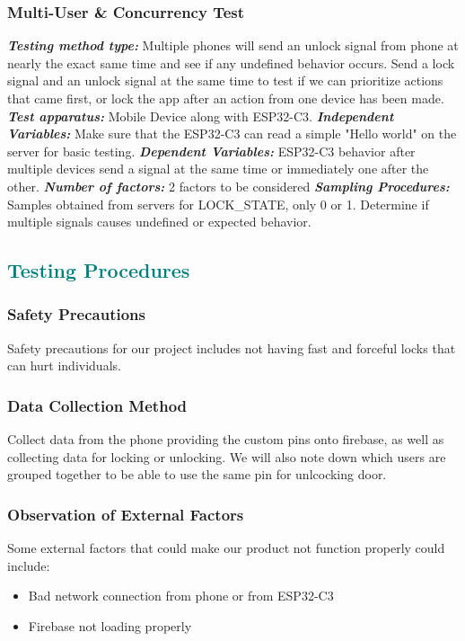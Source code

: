 \subsubsection{Multi-User \& Concurrency Test}
\textbf{\textit{Testing method type:}} Multiple phones will send an unlock signal from phone at nearly the exact same time and see if any undefined behavior occurs. Send a lock signal and an unlock signal at the same time to test if we can prioritize actions that came first, or lock the app after an action from one device has been made.
\newline
\textbf{\textit{Test apparatus:}} Mobile Device along with ESP32-C3.
\newline
\textbf{\textit{Independent Variables:}} Make sure that the ESP32-C3 can read a simple "Hello world" on the server for basic testing.
\newline
\textbf{\textit{Dependent Variables:}} ESP32-C3 behavior after multiple devices send a signal at the same time or immediately one after the other.
\newline
\textbf{\textit{Number of factors:}} 2 factors to be considered
\newline
\textbf{\textit{Sampling Procedures:}} Samples obtained from servers for LOCK\_STATE, only 0 or 1. Determine if multiple signals causes undefined or expected behavior.



\textcolor{teal}{\subsection*{Testing Procedures}}
\subsubsection{Safety Precautions}
Safety precautions for our project includes not having fast and forceful locks that can hurt individuals.

\subsubsection{Data Collection Method}
Collect data from the phone providing the custom pins onto firebase, as well as collecting data for locking or unlocking. We will also note down which users are grouped together to be able to use the same pin for unlcocking door.

\subsubsection{Observation of External Factors}
Some external factors that could make our product not function properly could include:

\begin{itemize}
    \item Bad network connection from phone or from ESP32-C3
    \item Firebase not loading properly
\end{itemize}